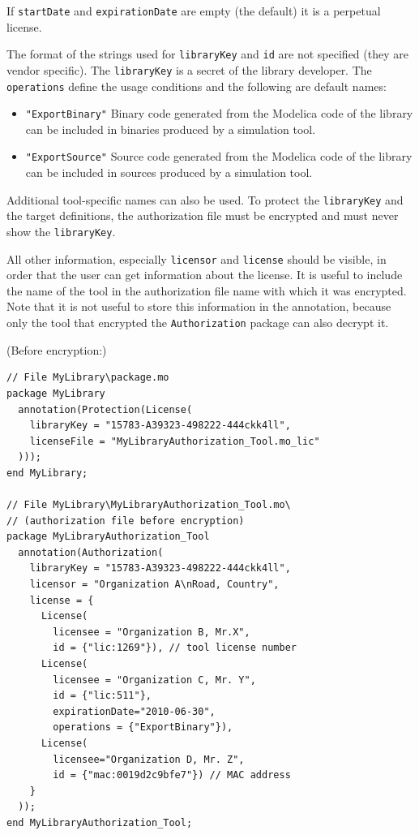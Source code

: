 \begin{annotationdefinition*}[License]
\begin{semantics}
If \lstinline!startDate! and \lstinline!expirationDate! are empty (the default) it is a perpetual license.

The format of the strings used for \lstinline!libraryKey! and \lstinline!id! are not specified (they are vendor specific).
The \lstinline!libraryKey! is a secret of the library developer.
The \lstinline!operations! define the usage conditions and the following are default names:
\begin{itemize}
\item
  \lstinline!"ExportBinary"! Binary code generated from the Modelica code of the library can be included in binaries produced by a simulation tool.
\item
  \lstinline!"ExportSource"! Source code generated from the Modelica code of the library can be included in sources produced by a simulation tool.
\end{itemize}

Additional tool-specific names can also be used.
To protect the \lstinline!libraryKey! and the target definitions, the authorization file must be encrypted and must never show the \lstinline!libraryKey!.

\begin{nonnormative}
All other information, especially \lstinline!licensor! and \lstinline!license! should be visible, in order that the user can get information about the license.
It is useful to include the name of the tool in the authorization file name with which it was encrypted.
Note that it is not useful to store this information in the annotation, because only the tool that encrypted the \lstinline!Authorization! package can also decrypt it.
\end{nonnormative}
\end{semantics}
\end{annotationdefinition*}

\begin{example}
(Before encryption:)
\begin{lstlisting}[language=modelica]
// File MyLibrary\package.mo
package MyLibrary
  annotation(Protection(License(
    libraryKey = "15783-A39323-498222-444ckk4ll",
    licenseFile = "MyLibraryAuthorization_Tool.mo_lic"
  )));
end MyLibrary;

// File MyLibrary\MyLibraryAuthorization_Tool.mo\
// (authorization file before encryption)
package MyLibraryAuthorization_Tool
  annotation(Authorization(
    libraryKey = "15783-A39323-498222-444ckk4ll",
    licensor = "Organization A\nRoad, Country",
    license = {
      License(
        licensee = "Organization B, Mr.X",
        id = {"lic:1269"}), // tool license number
      License(
        licensee = "Organization C, Mr. Y",
        id = {"lic:511"},
        expirationDate="2010-06-30",
        operations = {"ExportBinary"}),
      License(
        licensee="Organization D, Mr. Z",
        id = {"mac:0019d2c9bfe7"}) // MAC address
    }
  ));
end MyLibraryAuthorization_Tool;
\end{lstlisting}
\end{example}


